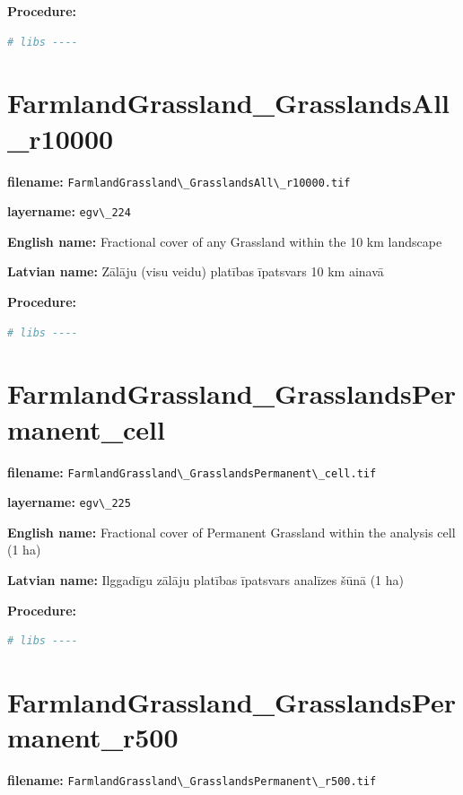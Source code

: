 \documentclass[
]{book}
\newcommand{\passthrough}[1]{#1}
\begin{document}
\textbf{Procedure:}

\begin{lstlisting}[language=R]
# libs ----
\end{lstlisting}

\section{FarmlandGrassland\_GrasslandsAll\_r10000}\label{ch06.224}

\textbf{filename:} \passthrough{\lstinline!FarmlandGrassland\_GrasslandsAll\_r10000.tif!}

\textbf{layername:} \passthrough{\lstinline!egv\_224!}

\textbf{English name:} Fractional cover of any Grassland within the 10 km landscape

\textbf{Latvian name:} Zālāju (visu veidu) platības īpatsvars 10 km ainavā

\textbf{Procedure:}

\begin{lstlisting}[language=R]
# libs ----
\end{lstlisting}

\section{FarmlandGrassland\_GrasslandsPermanent\_cell}\label{ch06.225}

\textbf{filename:} \passthrough{\lstinline!FarmlandGrassland\_GrasslandsPermanent\_cell.tif!}

\textbf{layername:} \passthrough{\lstinline!egv\_225!}

\textbf{English name:} Fractional cover of Permanent Grassland within the analysis cell (1 ha)

\textbf{Latvian name:} Ilggadīgu zālāju platības īpatsvars analīzes šūnā (1 ha)

\textbf{Procedure:}

\begin{lstlisting}[language=R]
# libs ----
\end{lstlisting}

\section{FarmlandGrassland\_GrasslandsPermanent\_r500}\label{ch06.226}

\textbf{filename:} \passthrough{\lstinline!FarmlandGrassland\_GrasslandsPermanent\_r500.tif!}
\end{document}
